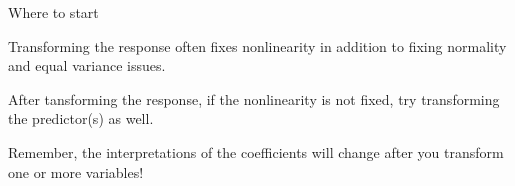 \documentclass{beamer}\usepackage[]{graphicx}\usepackage[]{color}
\begin{document}
\begin{darkframes}
\begin{frame}[fragile]{Where to start}
\begin{center}
        Transforming the response often fixes nonlinearity in addition to fixing normality and equal variance issues. \bigskip \pause
        
        After tansforming the response, if the nonlinearity is not fixed, try transforming the predictor(s) as well. \bigskip \pause
        
        Remember, the interpretations of the coefficients will change after you transform one or more variables!
        
      \end{center}
    
    \end{frame}
  

  \end{darkframes}

  
\end{document}
